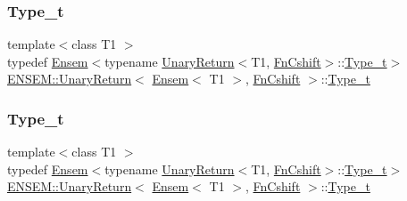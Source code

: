 \subsubsection{\texorpdfstring{Type\_t}{Type\_t}\hspace{0.1cm}{\footnotesize\ttfamily [1/3]}}
{\footnotesize\ttfamily template$<$class T1 $>$ \\
typedef \mbox{\hyperlink{classENSEM_1_1Ensem}{Ensem}}$<$typename \mbox{\hyperlink{structENSEM_1_1UnaryReturn}{Unary\+Return}}$<$T1, \mbox{\hyperlink{structENSEM_1_1FnCshift}{Fn\+Cshift}}$>$\+::\mbox{\hyperlink{structENSEM_1_1UnaryReturn_3_01Ensem_3_01T1_01_4_00_01FnCshift_01_4_a1adec9b456e13e2aebde180312ff6235}{Type\+\_\+t}}$>$ \mbox{\hyperlink{structENSEM_1_1UnaryReturn}{E\+N\+S\+E\+M\+::\+Unary\+Return}}$<$ \mbox{\hyperlink{classENSEM_1_1Ensem}{Ensem}}$<$ T1 $>$, \mbox{\hyperlink{structENSEM_1_1FnCshift}{Fn\+Cshift}} $>$\+::\mbox{\hyperlink{structENSEM_1_1UnaryReturn_3_01Ensem_3_01T1_01_4_00_01FnCshift_01_4_a1adec9b456e13e2aebde180312ff6235}{Type\+\_\+t}}}

\mbox{\label{structENSEM_1_1UnaryReturn_3_01Ensem_3_01T1_01_4_00_01FnCshift_01_4_a1adec9b456e13e2aebde180312ff6235}} 
\subsubsection{\texorpdfstring{Type\_t}{Type\_t}\hspace{0.1cm}{\footnotesize\ttfamily [2/3]}}
{\footnotesize\ttfamily template$<$class T1 $>$ \\
typedef \mbox{\hyperlink{classENSEM_1_1Ensem}{Ensem}}$<$typename \mbox{\hyperlink{structENSEM_1_1UnaryReturn}{Unary\+Return}}$<$T1, \mbox{\hyperlink{structENSEM_1_1FnCshift}{Fn\+Cshift}}$>$\+::\mbox{\hyperlink{structENSEM_1_1UnaryReturn_3_01Ensem_3_01T1_01_4_00_01FnCshift_01_4_a1adec9b456e13e2aebde180312ff6235}{Type\+\_\+t}}$>$ \mbox{\hyperlink{structENSEM_1_1UnaryReturn}{E\+N\+S\+E\+M\+::\+Unary\+Return}}$<$ \mbox{\hyperlink{classENSEM_1_1Ensem}{Ensem}}$<$ T1 $>$, \mbox{\hyperlink{structENSEM_1_1FnCshift}{Fn\+Cshift}} $>$\+::\mbox{\hyperlink{structENSEM_1_1UnaryReturn_3_01Ensem_3_01T1_01_4_00_01FnCshift_01_4_a1adec9b456e13e2aebde180312ff6235}{Type\+\_\+t}}}

